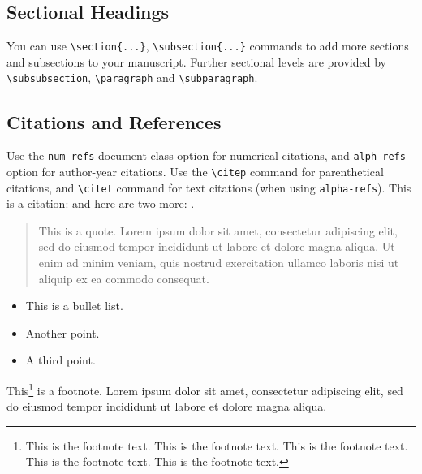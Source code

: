 \documentclass[a4paper,num-refs]{oup-contemporary}
\begin{document}
\subsection{Sectional Headings}
You can use \verb|\section{...}|, \verb|\subsection{...}| commands to add more sections and subsections to your manuscript. Further sectional levels are provided by \verb|\subsubsection|, \verb|\paragraph| and \verb|\subparagraph|.

\subsection{Citations and References}
Use the \verb|num-refs| document class option for numerical citations, and \verb|alph-refs| option for author-year citations.
Use the \verb|\citep| command for parenthetical citations, and \verb|\citet| command for text citations (when using \verb|alpha-refs|).
This is a citation: \citep{Fan:2004} and here are two more: \citep{Cox:1972,Hear:Holm:Step:quan:2006}.

\begin{quote}
This is a quote. Lorem ipsum dolor sit amet, consectetur adipiscing elit, sed do eiusmod tempor incididunt ut labore et dolore magna aliqua. Ut enim ad minim veniam, quis nostrud exercitation ullamco laboris nisi ut aliquip ex ea commodo consequat.
\end{quote}

\begin{itemize}
\item This is a bullet list.
\item Another point.
\item A third point.
\end{itemize}

This\footnote{This is the footnote text. This is the footnote text. This is the footnote text. This is the footnote text. This is the footnote text.} is a footnote. Lorem ipsum dolor sit amet, consectetur adipiscing elit, sed do eiusmod tempor incididunt ut labore et dolore magna aliqua.
\end{document}
